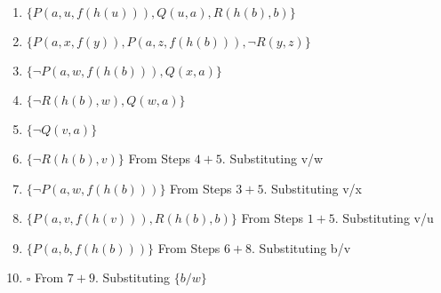 \documentclass{article}
\begin{document}
\begin{enumerate}
\begin{answer}
		\begin{enumerate}
		  \item $\{P(a, u, f(h(u))), Q(u, a), R(h(b), b)\}$
		  \item $\{P(a, x, f(y)), P(a, z, f(h(b))), \neg R(y, z)\}$
		  \item $\{\neg P(a, w, f(h(b))), Q(x, a)\}$
		  \item $\{\neg R(h(b), w), Q(w, a)\}$
		  \item $\{\neg Q(v, a)\}$
		  \item $\{\neg R(h(b), v)\}$ From Steps $4 + 5$. Substituting {v/w}
		  \item $\{\neg P(a, w, f(h(b)))\}$ From Steps $3 +  5$. Substituting {v/x}
		  \item $\{ P(a, v, f(h(v))), R(h(b), b)\}$ From Steps $1 + 5$. Substituting {v/u}
		  \item $\{ P(a, b, f(h(b)))\}$ From Steps $6 + 8$. Substituting {b/v}
		  \item $\square$ From $7 + 9$. Substituting $\{b/w\}$
		 \end{enumerate}
	\end{answer}
\end{enumerate}
\end{document}
